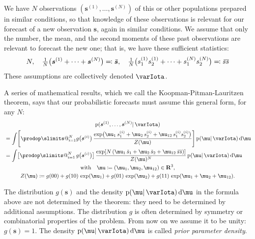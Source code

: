 \documentclass[\ifafour a4paper,12pt,\else a5paper,10pt,\fi%
onecolumn,oneside,article,%
british%
]{memoir}
\makeatletter
\theoremstyle{remark}
\theoremstyle{innote}
\def\prod{\DOTSI\prodop\slimits@}
\newcommand*{\di}{\mathrm{d}}%
\newcommand*{\RR}{\bm{\mathrm{R}}}
\newcommand*{\defd}{\coloneqq}
\newcommand*{\defs}{\eqqcolon}
\newcommand*{\pf}{\mathrm{p}}%
\renewcommand*{\|}{\mathpunct{|}}
\newcommand*{\tprod}{\mathop{\textstyle\prod}\nolimits}
\newcommand*{\widebar}[1]{{\mkern1.5mu\skew{2}\overline{\mkern-1.5mu#1\mkern-1.5mu}\mkern 1.5mu}}
\newcommand*{\yI}{\varIota}
\newcommand*{\ys}{\bm{s}}
\newcommand*{\yso}[1]{\ys^{(#1)}}
\newcommand*{\ysso}[1]{s^{(#1)}}
\newcommand*{\la}{\mu_{12}}
\newcommand*{\yth}{\bm{\mu}}
\newcommand*{\yav}{\widebar{\ys}}
\newcommand*{\yavv}{\widebar{s}}
\newcommand*{\ycv}{\widebar{ss}}
\makeatother
\begin{document}
We have $N$ observations $(\yso{1}, \dotsc, \yso{N})$ of this or other
populations prepared in similar conditions, so that knowledge of these
observations is relevant for our forecast of a new observation $\ys$, again
in similar conditions. We assume that only the number, the mean, and the
second moments of these past observations are relevant to forecast the new
one; that is, we have these sufficient statistics:
\begin{equation}
  \label{eq:mean_2ndmom}
  N,\quad
  \tfrac{1}{N}\bigl( \yso{1} + \dotsb + \yso{N} \bigr) \defs \yav,
  \quad
  \tfrac{1}{N}\bigl( \ysso{1}_1\ysso{1}_2 + \dotsb + \ysso{N}_1 \ysso{N}_2 \bigr)
  \defs \ycv
\end{equation}
These assumptions are collectively denoted $\yI$.

A series of mathematical results, which we call the
Koopman-Pitman-Lauritzen theorem, says that our probabilistic forecasts
must assume this general form, for any $N$:
\begin{multline}
  \label{eq:predictive_KP}
    \pf(\yso{1}, \dotsc, \yso{N} \|\yI )
\\  
\begin{aligned}
  &=\int
\Biggl[  \prod_{i=1}^{N}
  g\bigl(\yso{i}\bigr)\,
  \frac{  \exp\bigl(
    \mu_1\, \ysso{i}_1 + \mu_2\, \ysso{i}_2 + \la\, \ysso{i}_1 \ysso{i}_2
    \bigr) }{Z(\yth)}
  \Biggr]\,
  \pf(\yth \| \yI)\,\di\yth 
\\
  &=\int
  \bigl[\tprod_{i=1}^{N}g\bigl(\yso{i}\bigr) \bigr]\,
  \frac{  \exp[N \, (
    \mu_1\, \yavv_1 + \mu_2\, \yavv_2 + \la\, \ycv)]}{Z(\yth)^N}
\,  \pf(\yth \| \yI)\,\di\yth 
\end{aligned}
\\
\text{with}\quad
\yth\defd (\mu_1,\mu_2,\la) \in \RR^3,\\
  Z(\yth) \defd
  g(00)+ g(10)\,\exp(\mu_1) + g(01)\,\exp(\mu_2) + g(11)\,\exp(\mu_1+\mu_2+\la).
\end{multline}

The distribution $g(\ys)$ and the density $\pf(\yth \| \yI)\,\di\yth $ in
the formula above are not determined by the theorem: they need to be
determined by additional assumptions. The distribution $g$ is often
determined by symmetry or combinatorial properties of the problem.
From now on we assume it to be unity: $g(\ys)=1$. The density
$\pf(\yth \|\yI)\,\di\yth $ is called \emph{prior parameter density}.
\end{document}
